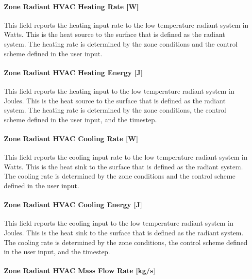 \paragraph{Zone Radiant HVAC Heating Rate {[}W{]}}\label{zone-radiant-hvac-heating-rate-w-1}

This field reports the heating input rate to the low temperature radiant system in Watts. This is the heat source to the surface that is defined as the radiant system. The heating rate is determined by the zone conditions and the control scheme defined in the user input.

\paragraph{Zone Radiant HVAC Heating Energy {[}J{]}}\label{zone-radiant-hvac-heating-energy-j-1}

This field reports the heating input to the low temperature radiant system in Joules. This is the heat source to the surface that is defined as the radiant system. The heating rate is determined by the zone conditions, the control scheme defined in the user input, and the timestep.

\paragraph{Zone Radiant HVAC Cooling Rate {[}W{]}}\label{zone-radiant-hvac-cooling-rate-w-1}

This field reports the cooling input rate to the low temperature radiant system in Watts. This is the heat sink to the surface that is defined as the radiant system. The cooling rate is determined by the zone conditions and the control scheme defined in the user input.

\paragraph{Zone Radiant HVAC Cooling Energy {[}J{]}}\label{zone-radiant-hvac-cooling-energy-j-1}

This field reports the cooling input to the low temperature radiant system in Joules. This is the heat sink to the surface that is defined as the radiant system. The cooling rate is determined by the zone conditions, the control scheme defined in the user input, and the timestep.

\paragraph{Zone Radiant HVAC Mass Flow Rate {[}kg/s{]}}\label{zone-radiant-hvac-mass-flow-rate-kgs}

